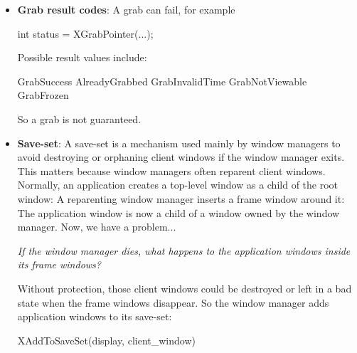 \documentclass{report}
\begin{document}
\begin{itemize}
\begin{itemize}
            \end{itemize}
            \bigbreak \noindent 
            This is useful when a client wants to inspect an event before deciding whether it should be replayed or swallowed.
            \bigbreak \noindent 
            XAllowEvents() can generate a \textbf{BadValue} error.
        \item \textbf{Grab result codes}: A grab can fail, for example
            \bigbreak \noindent 
            \begin{cppcode}
            int status = XGrabPointer(...);
            \end{cppcode}
            \bigbreak \noindent 
            Possible result values include:
            \bigbreak \noindent 
            \begin{cppcode}
                GrabSuccess
                AlreadyGrabbed
                GrabInvalidTime
                GrabNotViewable
                GrabFrozen
            \end{cppcode}
            \bigbreak \noindent 
            So a grab is not guaranteed. 
        \item \textbf{Save-set}: A save-set is a mechanism used mainly by window managers to avoid destroying or orphaning client windows if the window manager exits. This matters because window managers often reparent client windows.
            \bigbreak \noindent 
            Normally, an application creates a top-level window as a child of the root window:
            \bigbreak \noindent 
            \bigbreak \noindent 
            A reparenting window manager inserts a frame window around it:
            \bigbreak \noindent 
            \bigbreak \noindent 
            The application window is now a child of a window owned by the window manager. Now, we have a problem...
            \begin{center}
                \textit{If the window manager dies, what happens to the application windows inside its frame windows?}
            \end{center}
            Without protection, those client windows could be destroyed or left in a bad state when the frame windows disappear. So the window manager adds application windows to its save-set:
            \bigbreak \noindent 
            \begin{cppcode}
            XAddToSaveSet(display, client_window)
            \end{cppcode}
            \bigbreak \noindent 

\end{itemize}
\end{document}
